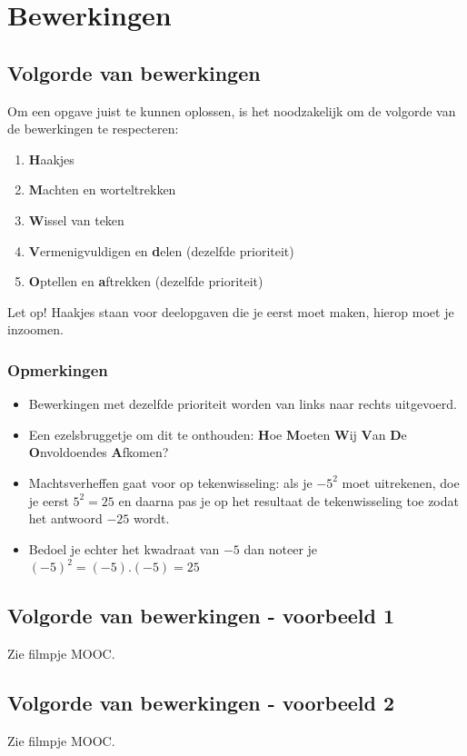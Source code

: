 \section{Bewerkingen}

\subsection{Volgorde van bewerkingen}
Om een opgave juist te kunnen oplossen, is het noodzakelijk om de volgorde van de bewerkingen te respecteren:

\begin{enumerate}
	\item \textbf{H}aakjes
	\item \textbf{M}achten en worteltrekken
	\item \textbf{W}issel van teken
	\item \textbf{V}ermenigvuldigen en \textbf{d}elen (dezelfde prioriteit)
	\item \textbf{O}ptellen en \textbf{a}ftrekken (dezelfde prioriteit)
\end{enumerate}

Let op! Haakjes staan voor deelopgaven die je eerst moet maken, hierop moet je inzoomen.

\subsubsection{Opmerkingen}
\begin{itemize}
	\item Bewerkingen met dezelfde prioriteit worden van links naar rechts uitgevoerd.
	\item Een ezelsbruggetje om dit te onthouden: \textbf{H}oe \textbf{M}oeten \textbf{W}ij \textbf{V}an \textbf{D}e \textbf{O}nvoldoendes \textbf{A}fkomen?
	\item Machtsverheffen gaat voor op tekenwisseling: als je $-5^2$ moet uitrekenen, doe je eerst $5^2=25$ en daarna pas je op het resultaat de tekenwisseling toe zodat het antwoord $-25$ wordt.
	\item Bedoel je echter het kwadraat van $-5$ dan noteer je $(-5)^2=(-5).(-5)=25$
\end{itemize}

\subsection{Volgorde van bewerkingen - voorbeeld 1}
Zie filmpje MOOC.

\subsection{Volgorde van bewerkingen - voorbeeld 2}
Zie filmpje MOOC.

